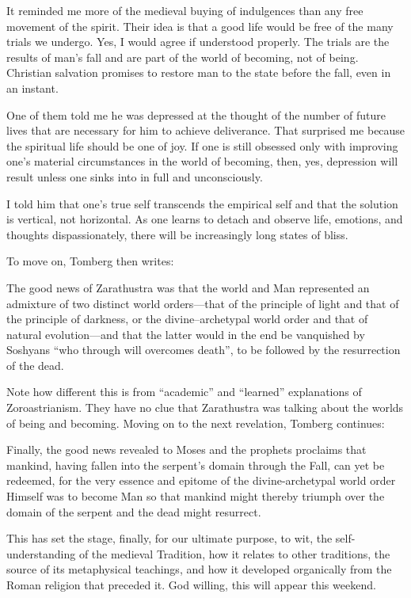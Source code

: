 It reminded me more of the medieval buying of indulgences than any free movement of the spirit. Their idea is that a good life would be free of the many trials we undergo. Yes, I would agree if understood properly. The trials are the results of man's fall and are part of the world of becoming, not of being. Christian salvation promises to restore man to the state before the fall, even in an instant.

One of them told me he was depressed at the thought of the number of future lives that are necessary for him to achieve deliverance. That surprised me because the spiritual life should be one of joy. If one is still obsessed only with improving one's material circumstances in the world of becoming, then, yes, depression will result unless one sinks into in full and unconsciously.

I told him that one's true self transcends the empirical self and that the solution is vertical, not horizontal. As one learns to detach and observe life, emotions, and thoughts dispassionately, there will be increasingly long states of bliss.

To move on, Tomberg then writes:

\begin{quotex}
The good news of Zarathustra was that the world and Man represented an admixture of two distinct world orders---that of the principle of light and that of the principle of darkness, or the divine--archetypal world order and that of natural evolution---and that the latter would in the end be vanquished by Soshyans ``who through will overcomes death'', to be followed by the resurrection of the dead.
\end{quotex}


Note how different this is from ``academic'' and ``learned'' explanations of Zoroastrianism. They have no clue that Zarathustra was talking about the worlds of being and becoming. Moving on to the next revelation, Tomberg continues:

\begin{quotex}
Finally, the good news revealed to Moses and the prophets proclaims that mankind, having fallen into the serpent's domain through the Fall, can yet be redeemed, for the very essence and epitome of the divine-archetypal world order Himself was to become Man so that mankind might thereby triumph over the domain of the serpent and the dead might resurrect.
\end{quotex}


This has set the stage, finally, for our ultimate purpose, to wit, the self-understanding of the medieval Tradition, how it relates to other traditions, the source of its metaphysical teachings, and how it developed organically from the Roman religion that preceded it. God willing, this will appear this weekend.


